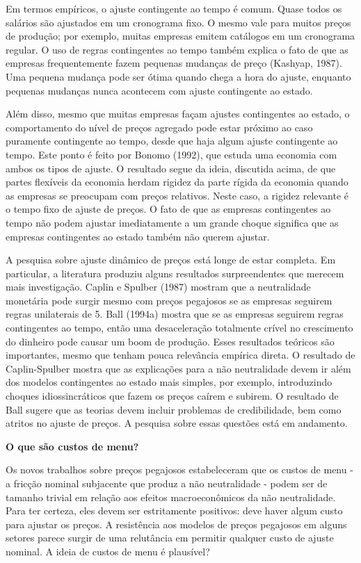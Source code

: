 \documentclass[12pt]{article}
\begin{document}
Em termos empíricos, o ajuste contingente ao tempo é comum. Quase todos os salários são ajustados em um cronograma fixo. O mesmo vale para muitos preços de produção; por exemplo, muitas empresas emitem catálogos em um cronograma regular. O uso de regras contingentes ao tempo também explica o fato de que as empresas frequentemente fazem pequenas mudanças de preço (Kashyap, 1987). Uma pequena mudança pode ser ótima quando chega a hora do ajuste, enquanto pequenas mudanças nunca acontecem com ajuste contingente ao estado.

Além disso, mesmo que muitas empresas façam ajustes contingentes ao estado, o comportamento do nível de preços agregado pode estar próximo ao caso puramente contingente ao tempo, desde que haja algum ajuste contingente ao tempo. Este ponto é feito por Bonomo (1992), que estuda uma economia com ambos os tipos de ajuste. O resultado segue da ideia, discutida acima, de que partes flexíveis da economia herdam rigidez da parte rígida da economia quando as empresas se preocupam com preços relativos. Neste caso, a rigidez relevante é o tempo fixo de ajuste de preços. O fato de que as empresas contingentes ao tempo não podem ajustar imediatamente a um grande choque significa que as empresas contingentes ao estado também não querem ajustar.

A pesquisa sobre ajuste dinâmico de preços está longe de estar completa. Em particular, a literatura produziu alguns resultados surpreendentes que merecem mais investigação. Caplin e Spulber (1987) mostram que a neutralidade monetária pode surgir mesmo com preços pegajosos se as empresas seguirem regras unilaterais de 5. Ball (1994a) mostra que se as empresas seguirem regras contingentes ao tempo, então uma desaceleração totalmente crível no crescimento do dinheiro pode causar um boom de produção. Esses resultados teóricos são importantes, mesmo que tenham pouca relevância empírica direta. O resultado de Caplin-Spulber mostra que as explicações para a não neutralidade devem ir além dos modelos contingentes ao estado mais simples, por exemplo, introduzindo choques idiossincráticos que fazem os preços caírem e subirem. O resultado de Ball sugere que as teorias devem incluir problemas de credibilidade, bem como atritos no ajuste de preços. A pesquisa sobre essas questões está em andamento.

\textbf{O que são custos de menu?}

Os novos trabalhos sobre preços pegajosos estabeleceram que os custos de menu - a fricção nominal subjacente que produz a não neutralidade - podem ser de tamanho trivial em relação aos efeitos macroeconômicos da não neutralidade. Para ter certeza, eles devem ser estritamente positivos: deve haver algum custo para ajustar os preços. A resistência aos modelos de preços pegajosos em alguns setores parece surgir de uma relutância em permitir qualquer custo de ajuste nominal. A ideia de custos de menu é plausível?
\end{document}
